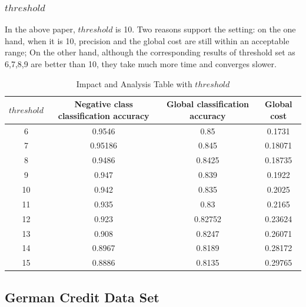 \documentclass{svjour3}                     %
\begin{document}
\subsubsection{$threshold$}
In the above paper, $threshold$ is 10. Two reasons support the setting: on the one hand, when it is 10,
precision and the global cost are still within an acceptable range; On the other hand, although the corresponding results of threshold set as 6,7,8,9 are better than 10, they take much more time and converges slower.


\begin{table}[htbp]
  \centering
    \begin{tabular}{cccc}
    \toprule
    $threshold$ & Negative class classification accuracy & Global classification accuracy & Global cost \\
    \midrule
    6     & 0.9546 & 0.85  & 0.1731 \\
    7     & 0.95186 & 0.845 & 0.18071 \\
    8     & 0.9486 & 0.8425 & 0.18735 \\
    9     & 0.947 & 0.839 & 0.1922 \\
    10    & 0.942 & 0.835 & 0.2025 \\
    11    & 0.935 & 0.83  & 0.2165 \\
    12    & 0.923 & 0.82752 & 0.23624 \\
    13    & 0.908 & 0.8247 & 0.26071 \\
    14    & 0.8967 & 0.8189 & 0.28172 \\
    15    & 0.8886 & 0.8135 & 0.29765 \\
    \bottomrule
    \end{tabular}
    \caption{Impact and Analysis Table with $threshold$}
  \label{tab:threshold}
\end{table}

\subsection{German Credit Data Set}\label{subsec:exp1}
\end{document}
